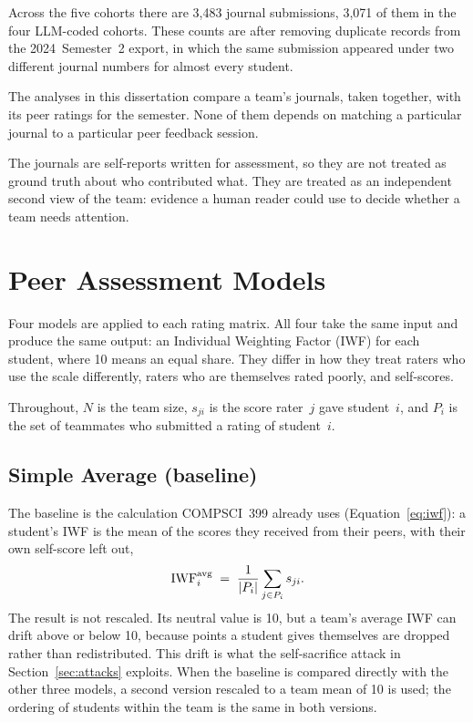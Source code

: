 Across the five cohorts there are 3,483 journal submissions, 3,071 of them in
the four LLM-coded cohorts. These counts are after removing duplicate records
from the 2024~Semester~2 export, in which the same submission appeared under two
different journal numbers for almost every student.

The analyses in this dissertation compare a team's journals, taken together,
with its peer ratings for the semester. None of them depends on matching a
particular journal to a particular peer feedback session.

The journals are self-reports written for assessment, so they are not treated
as ground truth about who contributed what. They are treated as an independent
second view of the team: evidence a human reader could use to decide whether a
team needs attention.


\section{Peer Assessment Models}
\label{sec:models}

Four models are applied to each rating matrix. All four take the same input
and produce the same output: an Individual Weighting Factor (IWF) for each
student, where 10 means an equal share. They differ in how they treat raters who
use the scale differently, raters who are themselves rated poorly, and
self-scores.

Throughout, $N$ is the team size, $s_{ji}$ is the score rater~$j$ gave
student~$i$, and $P_i$ is the set of teammates who submitted a rating of
student~$i$.

\subsection{Simple Average (baseline)}
\label{sec:simple-avg}

The baseline is the calculation COMPSCI~399 already uses
(Equation~\ref{eq:iwf}): a student's IWF is the mean of the scores they
received from their peers, with their own self-score left out,
\begin{equation}
  \mathrm{IWF}_i^{\text{avg}} \;=\; \frac{1}{|P_i|} \sum_{j \in P_i} s_{ji}.
  \label{eq:baseline}
\end{equation}
The result is not rescaled. Its neutral value is 10, but a team's average IWF
can drift above or below 10, because points a student gives themselves are
dropped rather than redistributed. This drift is what the self-sacrifice attack
in Section~\ref{sec:attacks} exploits. When the baseline is compared directly with
the other three models, a second version rescaled to a team mean of 10 is used;
the ordering of students within the team is the same in both versions.

